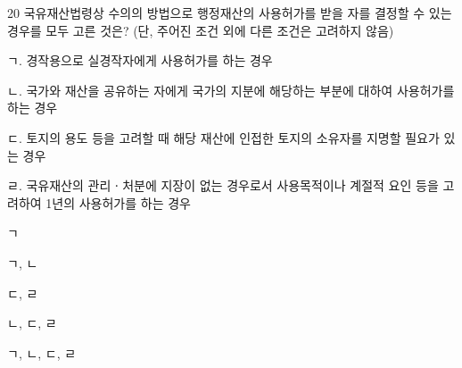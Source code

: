\begin{question}{20}
국유재산법령상 수의의 방법으로 행정재산의 사용허가를 받을 자를 결정할 수 있는 경우를 모두 고른 것은? (단, 주어진 조건 외에 다른 조건은 고려하지 않음)
\begin{framedtext}
ㄱ. 경작용으로 실경작자에게 사용허가를 하는 경우 \par
ㄴ. 국가와 재산을 공유하는 자에게 국가의 지분에 해당하는 부분에 대하여 사용허가를 하는 경우 \par
ㄷ. 토지의 용도 등을 고려할 때 해당 재산에 인접한 토지의 소유자를 지명할 필요가 있는 경우 \par
ㄹ. 국유재산의 관리ㆍ처분에 지장이 없는 경우로서 사용목적이나 계절적 요인 등을 고려하여 1년의 사용허가를 하는 경우 \par
\end{framedtext}
\begin{choices}
  \item ㄱ
  \item ㄱ, ㄴ
  \item ㄷ, ㄹ
  \item ㄴ, ㄷ, ㄹ
  \item ㄱ, ㄴ, ㄷ, ㄹ
\end{choices}
\end{question}
